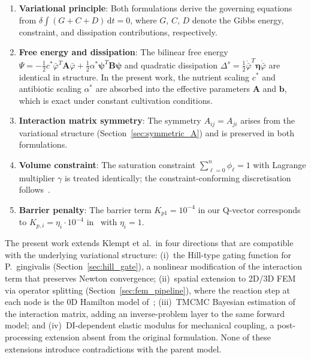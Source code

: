 \documentclass[11pt,a4paper]{article}
\begin{document}
\begin{enumerate}
  \item \textbf{Variational principle}: Both formulations derive the governing equations from $\delta\int(G + C + D)\,\mathrm{d}t = 0$, where $G$, $C$, $D$ denote the Gibbs energy, constraint, and dissipation contributions, respectively.
  \item \textbf{Free energy and dissipation}: The bilinear free energy $\Psi = -\tfrac{1}{2}c^{*}\bar{\varphi}^T\mathbf{A}\bar{\varphi} + \tfrac{1}{2}\alpha^{*}\boldsymbol{\psi}^T\mathbf{B}\boldsymbol{\psi}$ and quadratic dissipation $\Delta^{s} = \tfrac{1}{2}\dot{\bar{\varphi}}^T\boldsymbol{\eta}\dot{\bar{\varphi}}$ are identical in structure. In the present work, the nutrient scaling $c^{*}$ and antibiotic scaling $\alpha^{*}$ are absorbed into the effective parameters $\mathbf{A}$ and $\mathbf{b}$, which is exact under constant cultivation conditions.
  \item \textbf{Interaction matrix symmetry}: The symmetry $A_{ij} = A_{ji}$ arises from the variational structure (Section~\ref{sec:symmetric_A}) and is preserved in both formulations.
  \item \textbf{Volume constraint}: The saturation constraint $\sum_{\ell=0}^{n}\phi_{\ell} = 1$ with Lagrange multiplier $\gamma$ is treated identically; the constraint-conforming discretisation follows~\cite{Bode2025ConstraintConforming}.
  \item \textbf{Barrier penalty}: The barrier term $K_{p1} = 10^{-4}$ in our Q-vector corresponds to $K_{p,i} = \eta_i \cdot 10^{-4}$ in~\cite{Klempt2025ContinuumBiofilm} with $\eta_i = 1$.
\end{enumerate}

\noindent The present work extends Klempt et al.\ in four directions that are compatible with the underlying variational structure: (i)~the Hill-type gating function for P.~gingivalis (Section~\ref{sec:hill_gate}), a nonlinear modification of the interaction term that preserves Newton convergence; (ii)~spatial extension to 2D/3D FEM via operator splitting (Section~\ref{sec:fem_pipeline}), where the reaction step at each node is the 0D Hamilton model of~\cite{Klempt2025ContinuumBiofilm}; (iii)~TMCMC Bayesian estimation of the interaction matrix, adding an inverse-problem layer to the same forward model; and (iv)~DI-dependent elastic modulus for mechanical coupling, a post-processing extension absent from the original formulation. None of these extensions introduce contradictions with the parent model.
\end{document}
